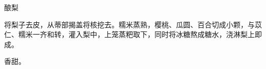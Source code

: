 \begin{recipe}{酿梨}

\ingredients


\cooking

将梨子去皮，从蒂部揭盖将核挖去。糯米蒸熟，樱桃、瓜圆、百合切成小颗，与苡仁、糯米一齐和转，灌入梨中，上笼蒸粑取下，同时将冰糖熬成糖水，浇淋梨上即成。

\notes

香甜。

\end{recipe}

